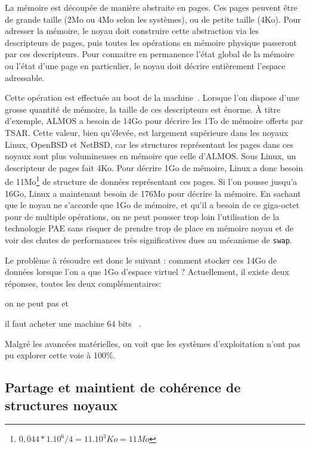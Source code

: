       La mémoire est découpée de manière abstraite en pages. Ces pages peuvent
      être de grande taille (2Mo ou 4Mo selon les systèmes), ou de petite taille
      (4Ko). Pour adresser la mémoire, le noyau doit construire cette
      abstraction via les descripteurs de pages, puis toutes les opérations en
      mémoire physique passeront par ces descripteurs. Pour connaitre en
      permanence l'état global de la mémoire ou l'état d'une page en
      particulier, le noyau doit décrire entièrement l'espace
      adressable.

      Cette opération est effectuée au boot de la machine~\citep{cranor1999uvm,
        gorman2004understanding, russinovich2012windows}. Lorsque l’on dispose
      d’une grosse quantité de mémoire, la taille de ces descripteurs est
      énorme. À titre d’exemple, ALMOS a besoin de 14Go pour décrire les 1To de
      mémoire offerts par TSAR. Cette valeur, bien qu’élevée, est largement
      supérieure dans les noyaux Linux, OpenBSD et NetBSD, car les structures
      représentant les pages dans ces noyaux sont plus volumineuses en mémoire
      que celle d’ALMOS. Sous Linux, un descripteur de pages fait 4Ko. Pour
      décrire 1Go de mémoire, Linux a donc besoin de
      11Mo\footnote{$0,044*1.10^6/4 = 11.10^3Ko = 11Mo$} de structure de données
      représentant ces pages. Si l'on pousse jusqu'a 16Go, Linux a maintenant
      besoin de 176Mo pour décrire la mémoire. En sachant que le noyau ne
      s'accorde que 1Go de mémoire, et qu'il a besoin de ce giga-octet pour de
      multiple opérations, on ne peut pousser trop loin l'utilisation de la
      technologie PAE sans risquer de prendre trop de place en mémoire noyau et
      de voir des chutes de performances très significatives dues au mécanisme
      de \texttt{swap}.

      Le problème à résoudre est donc le suivant : comment stocker ces 14Go de
      données lorsque l’on a que 1Go d’espace virtuel ?  Actuellement, il existe
      deux réponses, toutes les deux complémentaires: \benumline \item on ne
      peut pas et \item il faut acheter une machine 64
      bits~\citep{gorman2004understanding} \eenumline.

      Malgré les avancées matérielles, on voit que les systèmes d'exploitation
      n'ont pas pu explorer cette voie à 100\%.


  \subsection{Partage et maintient de cohérence de structures noyaux}
  \label{sec:consistency}
  




